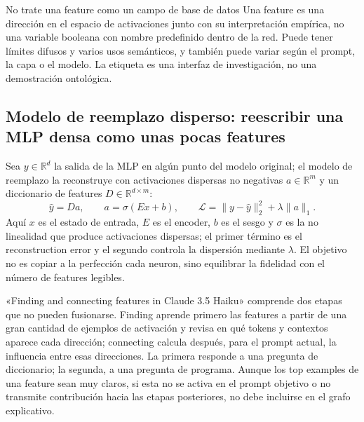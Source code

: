 \begin{warningbox}{No trate una feature como un campo de base de datos}
Una feature es una dirección en el espacio de activaciones junto con su interpretación empírica, no una variable booleana con nombre predefinido dentro de la red. Puede tener límites difusos y varios usos semánticos, y también puede variar según el prompt, la capa o el modelo. La etiqueta es una interfaz de investigación, no una demostración ontológica.
\end{warningbox}

\subsection{Modelo de reemplazo disperso: reescribir una MLP densa como unas pocas features}

Sea $y\in\mathbb{R}^d$ la salida de la MLP en algún punto del modelo original; el modelo de reemplazo la reconstruye con activaciones dispersas no negativas $a\in\mathbb{R}^m$ y un diccionario de features $D\in\mathbb{R}^{d\times m}$:
\[
\hat y=Da,\qquad
a=\sigma(Ex+b),\qquad
\mathcal{L}=\lVert y-\hat y\rVert_2^2+\lambda\lVert a\rVert_1.
\]
Aquí $x$ es el estado de entrada, $E$ es el encoder, $b$ es el sesgo y $\sigma$ es la no linealidad que produce activaciones dispersas; el primer término es el reconstruction error y el segundo controla la dispersión mediante $\lambda$. El objetivo no es copiar a la perfección cada neuron, sino equilibrar la fidelidad con el número de features legibles.

«Finding and connecting features in Claude 3.5 Haiku» comprende dos etapas que no pueden fusionarse. Finding aprende primero las features a partir de una gran cantidad de ejemplos de activación y revisa en qué tokens y contextos aparece cada dirección; connecting calcula después, para el prompt actual, la influencia entre esas direcciones. La primera responde a una pregunta de diccionario; la segunda, a una pregunta de programa. Aunque los top examples de una feature sean muy claros, si esta no se activa en el prompt objetivo o no transmite contribución hacia las etapas posteriores, no debe incluirse en el grafo explicativo.


